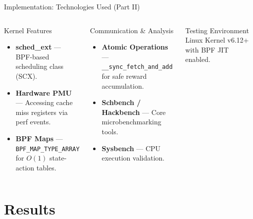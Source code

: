 \documentclass[aspectratio=169]{beamer}
\begin{document}
\begin{frame}{Implementation: Technologies Used (Part II)}
  \begin{columns}[T]
    
      \begin{block}{Kernel Features}
        \begin{itemize}\normalsize\itemsep5pt
          \item \textbf{sched\_ext} — BPF-based scheduling class (SCX).
          \item \textbf{Hardware PMU} — Accessing cache miss registers via perf events.
          \item \textbf{BPF Maps} — \texttt{BPF\_MAP\_TYPE\_ARRAY} for $O(1)$ state-action tables.
        \end{itemize}
      \end{block}
    
      \begin{block}{Communication \& Analysis}
        \begin{itemize}\normalsize\itemsep5pt
          \item \textbf{Atomic Operations} — \texttt{\_\_sync\_fetch\_and\_add} for safe reward accumulation.
          \item \textbf{Schbench / Hackbench} — Core microbenchmarking tools.
          \item \textbf{Sysbench} — CPU execution validation.
        \end{itemize}
      \end{block}
      
      \vspace{8pt}
      
      \begin{exampleblock}{Testing Environment}
        \normalsize Linux Kernel v6.12+ with BPF JIT enabled.
      \end{exampleblock}

  \end{columns}
\end{frame}

\section{Results}
\end{document}
